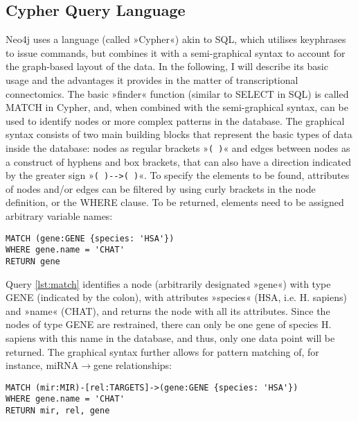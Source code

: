 \subsection{Cypher Query Language}
Neo4j uses a language (called »Cypher«) akin to SQL, which utilises keyphrases to issue commands, but combines it with a semi-graphical syntax to account for the graph-based layout of the data. In the following, I will describe its basic usage and the advantages it provides in the matter of transcriptional connectomics. The basic »finder« function (similar to \textcolor{dkblue}{SELECT} in SQL) is called \textcolor{dkblue}{MATCH} in Cypher, and, when combined with the semi-graphical syntax, can be used to identify nodes or more complex patterns in the database. The graphical syntax consists of two main building blocks that represent the basic types of data inside the database: nodes as regular brackets »\texttt{( )}« and edges between nodes as  a construct of hyphens and box brackets, that can also have a direction indicated by the greater sign \mbox{»\texttt{( )-\string[ \string]->( )}«}. To specify the elements to be found, attributes of nodes and/or edges can be filtered by using curly brackets in the node definition, or the \textcolor{dkblue}{WHERE} clause. To be returned, elements need to be assigned arbitrary variable names:

\begin{lstlisting}[label=lst:match,caption=MATCH,
language=Cypher]
MATCH (gene:GENE {species: 'HSA'})
WHERE gene.name = 'CHAT'
RETURN gene
\end{lstlisting}

Query \ref{lst:match} identifies a node (arbitrarily designated »gene«) with type GENE (indicated by the colon), with attributes »species« (HSA, i.e. H. sapiens) and »name« (CHAT), and returns the node with all its attributes. Since the nodes of type GENE are restrained, there can only be one gene of species H. sapiens with this name in the database, and thus, only one data point will be returned. The graphical syntax further allows for pattern matching of, for instance, miRNA$\to$gene relationships:

\begin{lstlisting}[label=lst:pattern,caption=Patterns,
language=Cypher]
MATCH (mir:MIR)-[rel:TARGETS]->(gene:GENE {species: 'HSA'})
WHERE gene.name = 'CHAT'
RETURN mir, rel, gene
\end{lstlisting}

